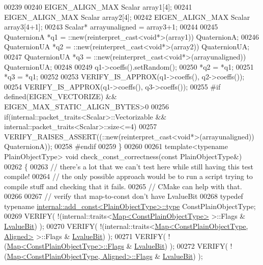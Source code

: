 \begin{DoxyCode}
00239 
00240   EIGEN\_ALIGN\_MAX Scalar array1[4];
00241   EIGEN\_ALIGN\_MAX Scalar array2[4];
00242   EIGEN\_ALIGN\_MAX Scalar array3[4+1];
00243   Scalar* arrayunaligned = array3+1;
00244 
00245   QuaternionA *q1 = ::new(reinterpret\_cast<void*>(array1)) QuaternionA;
00246   QuaternionUA *q2 = ::new(reinterpret\_cast<void*>(array2)) QuaternionUA;
00247   QuaternionUA *q3 = ::new(reinterpret\_cast<void*>(arrayunaligned)) QuaternionUA;
00248 
00249   q1->coeffs().setRandom();
00250   *q2 = *q1;
00251   *q3 = *q1;
00252 
00253   VERIFY\_IS\_APPROX(q1->coeffs(), q2->coeffs());
00254   VERIFY\_IS\_APPROX(q1->coeffs(), q3->coeffs());
00255 \textcolor{preprocessor}{  #if defined(EIGEN\_VECTORIZE) && EIGEN\_MAX\_STATIC\_ALIGN\_BYTES>0}
00256   \textcolor{keywordflow}{if}(internal::packet\_traits<Scalar>::Vectorizable && internal::packet\_traits<Scalar>::size<=4)
00257     VERIFY\_RAISES\_ASSERT((::\textcolor{keyword}{new}(reinterpret\_cast<void*>(arrayunaligned)) QuaternionA));
00258 \textcolor{preprocessor}{  #endif}
00259 \}
00260 
00261 \textcolor{keyword}{template}<\textcolor{keyword}{typename} PlainObjectType> \textcolor{keywordtype}{void} check\_const\_correctness(\textcolor{keyword}{const} PlainObjectType&)
00262 \{
00263   \textcolor{comment}{// there's a lot that we can't test here while still having this test compile!}
00264   \textcolor{comment}{// the only possible approach would be to run a script trying to compile stuff and checking that it
       fails.}
00265   \textcolor{comment}{// CMake can help with that.}
00266 
00267   \textcolor{comment}{// verify that map-to-const don't have LvalueBit}
00268   \textcolor{keyword}{typedef} \textcolor{keyword}{typename} \hyperlink{group___core___module_class_eigen_1_1_transpose}{internal::add\_const<PlainObjectType>::type} 
      ConstPlainObjectType;
00269   VERIFY( !(internal::traits<\hyperlink{group___core___module_class_eigen_1_1_map}{Map<ConstPlainObjectType>} >::Flags & 
      \hyperlink{group__flags_gae2c323957f20dfdc6cb8f44428eaec1a}{LvalueBit}) );
00270   VERIFY( !(internal::traits<\hyperlink{group___core___module_class_eigen_1_1_map}{Map<ConstPlainObjectType, Aligned>} >::Flags 
      & \hyperlink{group__flags_gae2c323957f20dfdc6cb8f44428eaec1a}{LvalueBit}) );
00271   VERIFY( !(\hyperlink{group___core___module_class_eigen_1_1_map}{Map<ConstPlainObjectType>::Flags} & 
      \hyperlink{group__flags_gae2c323957f20dfdc6cb8f44428eaec1a}{LvalueBit}) );
00272   VERIFY( !(\hyperlink{group___core___module_class_eigen_1_1_map}{Map<ConstPlainObjectType, Aligned>::Flags} & 
      \hyperlink{group__flags_gae2c323957f20dfdc6cb8f44428eaec1a}{LvalueBit}) );

\end{DoxyCode}
